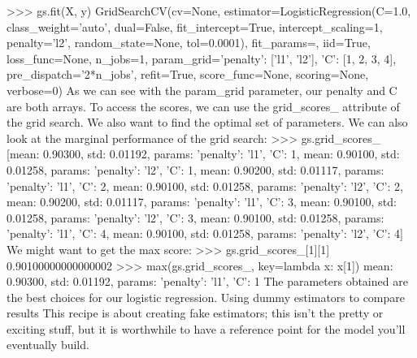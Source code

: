 >>> gs.fit(X, y)
GridSearchCV(cv=None, estimator=LogisticRegression(C=1.0,
class_weight='auto', dual=False, fit_intercept=True,
intercept_scaling=1, penalty='l2', random_state=None,
tol=0.0001), fit_params={}, iid=True, loss_func=None,
n_jobs=1, param_grid={'penalty': ['l1', 'l2'],
'C': [1, 2, 3, 4]}, pre_dispatch='2*n_jobs', refit=True,
score_func=None, scoring=None, verbose=0)
As we can see with the param_grid parameter, our penalty and C are both arrays.
To access the scores, we can use the grid_scores_ attribute of the grid search. We also
want to find the optimal set of parameters. We can also look at the marginal performance
of the grid search:
>>> gs.grid_scores_
[mean: 0.90300, std: 0.01192, params: {'penalty': 'l1', 'C': 1},
mean: 0.90100, std: 0.01258, params: {'penalty': 'l2', 'C': 1},
mean: 0.90200, std: 0.01117, params: {'penalty': 'l1', 'C': 2},
mean: 0.90100, std: 0.01258, params: {'penalty': 'l2', 'C': 2},
mean: 0.90200, std: 0.01117, params: {'penalty': 'l1', 'C': 3},
mean: 0.90100, std: 0.01258, params: {'penalty': 'l2', 'C': 3},
mean: 0.90100, std: 0.01258, params: {'penalty': 'l1', 'C': 4},
mean: 0.90100, std: 0.01258, params: {'penalty': 'l2', 'C': 4}]
We might want to get the max score:
>>> gs.grid_scores_[1][1]
0.90100000000000002
>>> max(gs.grid_scores_, key=lambda x: x[1])
mean: 0.90300, std: 0.01192, params: {'penalty': 'l1', 'C': 1}
The parameters obtained are the best choices for our logistic regression.
Using dummy estimators to compare results
This recipe is about creating fake estimators; this isn't the pretty or exciting stuff, but it is
worthwhile to have a reference point for the model you'll eventually build.
